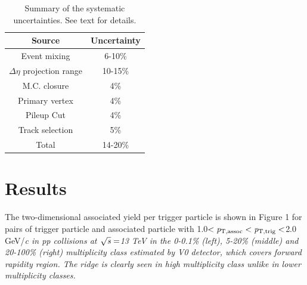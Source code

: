 \documentclass[ALICE,manyauthors]{cernphprep}
\begin{document}
\begin{table}[!h]
\centering
\caption{ Summary of the systematic uncertainties. See text for details.}
\begin{tabular}{ c|c }
\hline
Source &  Uncertainty \\ \hline
Event mixing & 6-10\% \\  \hline
$\Delta\eta$ projection range & 10-15\% \\ \hline
M.C. closure & 4\% \\ \hline
Primary vertex & 4\% \\ \hline
Pileup Cut & 4\% \\ \hline
Track selection & 5\% \\ \hline
Total & 14-20\% \\
\hline
\end{tabular}
\end{table}



\section {Results}

The two-dimensional associated yield per trigger particle is shown in Figure 1 for pairs of trigger particle and associated particle with 1.0$<\it{p}_{\rm{T, assoc}}<\it{p}_{\rm{T, trig}}<$2.0 GeV/\it{c}\rm{} in pp collisions at $\sqrt{\it{s}} = $\unit{13} {\rm{}TeV} in the 0-0.1\% (left), 5-20\% (middle) and 20-100\% (right) multiplicity class estimated by V0 detector, which covers forward rapidity region. The ridge is clearly seen in high multiplicity class unlike in lower multiplicity classes.
\end{document}
